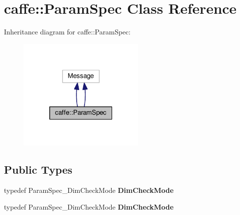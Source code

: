 \hypertarget{classcaffe_1_1_param_spec}{}\section{caffe\+:\+:Param\+Spec Class Reference}
\label{classcaffe_1_1_param_spec}


Inheritance diagram for caffe\+:\+:Param\+Spec\+:
\nopagebreak
\begin{figure}[H]
\begin{center}
\leavevmode
\includegraphics[width=175pt]{classcaffe_1_1_param_spec__inherit__graph}
\end{center}
\end{figure}
\subsection*{Public Types}
\begin{DoxyCompactItemize}
\item 
\mbox{\label{classcaffe_1_1_param_spec_a31fc8ae4f81a4e5619ed61c8af9ee23a}} 
typedef Param\+Spec\+\_\+\+Dim\+Check\+Mode {\bfseries Dim\+Check\+Mode}
\item 
\mbox{\label{classcaffe_1_1_param_spec_a31fc8ae4f81a4e5619ed61c8af9ee23a}} 
typedef Param\+Spec\+\_\+\+Dim\+Check\+Mode {\bfseries Dim\+Check\+Mode}
\end{DoxyCompactItemize}
